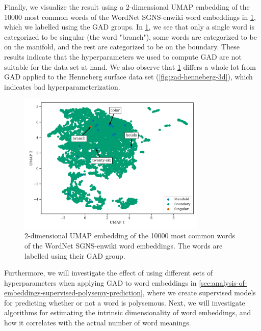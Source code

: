 Finally, we visualize the result using a 2-dimensional UMAP embedding of the 10000 most common words of the WordNet SGNS-enwiki word embeddings in \cref{fig:gad-umap-2d-10k-most-common-wordnet-enwiki-words}, which we labelled using the GAD groups. In \cref{fig:gad-umap-2d-10k-most-common-wordnet-enwiki-words}, we see that only a single word is categorized to be singular (the word "branch"), some words are categorized to be on the manifold, and the rest are categorized to be on the boundary. These results indicate that the hyperparameters we used to compute GAD are not suitable for the data set at hand. We also observe that \cref{fig:gad-umap-2d-10k-most-common-wordnet-enwiki-words} differs a whole lot from GAD applied to the Henneberg surface data set (\cref{fig:gad-henneberg-3d}), which indicates bad hyperparameterization.
\begin{figure}[H]
    \centering
    \includegraphics[width=0.8\textwidth]{thesis/figures/gad-umap-2d-10k-most-common-wordnet-enwiki-words.pdf}
    \caption{2-dimensional UMAP embedding of the 10000 most common words of the WordNet SGNS-enwiki word embeddings. The words are labelled using their GAD group.}
    \label{fig:gad-umap-2d-10k-most-common-wordnet-enwiki-words}
\end{figure}

Furthermore, we will investigate the effect of using different sets of hyperparameters when applying GAD to word embeddings in \cref{sec:analysis-of-embeddings-supervised-polysemy-prediction}, where we create supervised models for predicting whether or not a word is polysemous. Next, we will investigate algorithms for estimating the intrinsic dimensionality of word embeddings, and how it correlates with the actual number of word meanings.

